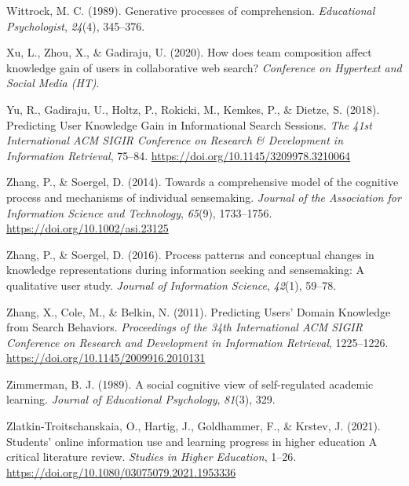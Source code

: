 \documentclass[letterpaper, nobind]{templates/ociamthesis}
\newlength{\cslhangindent}
\newenvironment{CSLReferences}[2] %
 {%
  \setlength{\parindent}{0pt}
  \ifodd #1
  \let\oldpar\par
  \def\par{\hangindent=\cslhangindent\oldpar}
  \fi
  \setlength{\parskip}{1mm}
  \setlength{\baselineskip}{6mm}
 }%
 {}
\begin{document}
\begin{CSLReferences}{1}{0}
\leavevmode{}%
Wittrock, M. C. (1989). Generative processes of comprehension. \emph{Educational Psychologist}, \emph{24}(4), 345--376.

\leavevmode{}%
Xu, L., Zhou, X., \& Gadiraju, U. (2020). How does team composition affect knowledge gain of users in collaborative web search? \emph{Conference on Hypertext and Social Media (HT)}.

\leavevmode{}%
Yu, R., Gadiraju, U., Holtz, P., Rokicki, M., Kemkes, P., \& Dietze, S. (2018). Predicting {User Knowledge Gain} in {Informational Search Sessions}. \emph{The 41st {International ACM SIGIR Conference} on {Research} \& {Development} in {Information Retrieval}}, 75--84. \url{https://doi.org/10.1145/3209978.3210064}

\leavevmode{}%
Zhang, P., \& Soergel, D. (2014). Towards a comprehensive model of the cognitive process and mechanisms of individual sensemaking. \emph{Journal of the Association for Information Science and Technology}, \emph{65}(9), 1733--1756. \url{https://doi.org/10.1002/asi.23125}

\leavevmode{}%
Zhang, P., \& Soergel, D. (2016). Process patterns and conceptual changes in knowledge representations during information seeking and sensemaking: A qualitative user study. \emph{Journal of Information Science}, \emph{42}(1), 59--78.

\leavevmode{}%
Zhang, X., Cole, M., \& Belkin, N. (2011). Predicting {Users}' {Domain Knowledge} from {Search Behaviors}. \emph{Proceedings of the 34th {International ACM SIGIR Conference} on {Research} and {Development} in {Information Retrieval}}, 1225--1226. \url{https://doi.org/10.1145/2009916.2010131}

\leavevmode{}%
Zimmerman, B. J. (1989). A social cognitive view of self-regulated academic learning. \emph{Journal of Educational Psychology}, \emph{81}(3), 329.

\leavevmode{}%
Zlatkin-Troitschanskaia, O., Hartig, J., Goldhammer, F., \& Krstev, J. (2021). Students' online information use and learning progress in higher education \textendash{} {A} critical literature review. \emph{Studies in Higher Education}, 1--26. \url{https://doi.org/10.1080/03075079.2021.1953336}

\end{CSLReferences}

\end{document}
